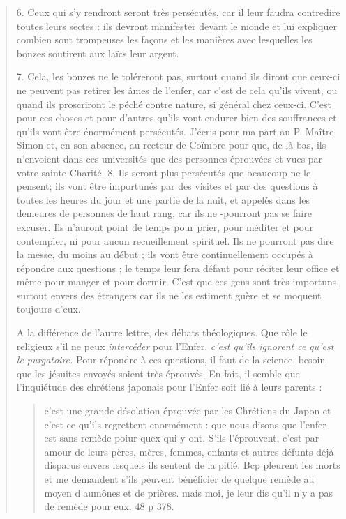 \begin{quote}
\begin{Synthesis}
\end{Synthesis}
6. Ceux qui s'y rendront seront très persécutés, car il leur faudra
contredire toutes leurs sectes : ils devront manifester devant le
monde et lui expliquer combien sont trompeuses les façons et les
manières avec lesquelles les bonzes soutirent aux laïcs leur argent.


7. Cela, les bonzes ne le toléreront pas, surtout quand ils
diront que ceux-ci ne peuvent pas retirer les âmes de l'enfer, car
c'est de cela qu'ils vivent, ou quand ils proscriront le péché contre
nature, si général chez ceux-ci. C'est pour ces choses et pour
d'autres qu'ils vont endurer bien des souffrances et qu'ils vont être
énormément persécutés. J'écris pour ma part au P. Maître Simon
et, en son absence, au recteur de Coïmbre pour que, de là-bas, ils
n'envoient dans ces universités que des personnes éprouvées et vues
par votre sainte Charité. 
8. Ils seront plus persécutés que beaucoup ne le pensent; ils vont
être importunés par des visites et par des questions à toutes les heures
du jour et une partie de la nuit, et appelés dans les demeures
de personnes de haut rang, car ils ne -pourront pas se faire excuser.
Ils n'auront point de temps pour prier, pour méditer et pour
contempler, ni pour aucun recueillement spirituel. Ils ne pourront
pas dire la messe, du moins au début ; ils vont être continuellement
occupés à répondre aux questions ; le temps leur fera défaut pour
réciter leur office et même pour manger et pour dormir. C'est que
ces gens sont très importuns, surtout envers des étrangers car ils
ne les estiment guère et se moquent toujours d'eux.
\begin{Synthesis}
A la différence de l'autre lettre, des débats théologiques. Que rôle le religieux s'il ne peux \textit{intercéder} pour l'Enfer. \textit{c'est qu'ils ignorent ce qu'est le purgatoire.} Pour répondre à ces questions, il faut de la science. besoin que les jésuites envoyés soient très éprouvés.
En fait, il semble que l'inquiétude des chrétiens japonais pour l'Enfer soit lié à leurs parents : 
\begin{quote}
    c'est une grande désolation éprouvée par les Chrétiens du Japon et c'est ce qu'ils regrettent enormément : que nous disons que l'enfer est sans remède poiur quex qui y ont. S'ils l'éprouvent, c'est par amour de leurs pères, mères, femmes, enfants et autres défunts déjà disparus envers lesquels ils sentent de la pitié. Bcp pleurent les morts et me demandent s'ils peuvent bénéficier de quelque remède au moyen d'aumônes et de prières. mais moi, je leur dis qu'il n'y a pas de remède pour eux. 48 p 378.
    

\end{quote}
\end{Synthesis}
\end{quote}
